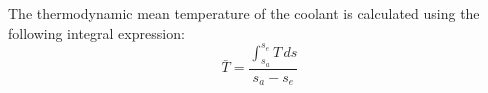 The thermodynamic mean temperature of the coolant is calculated using the following integral expression:  
\[
\bar{T} = \frac{\int_{s_a}^{s_e} T \, ds}{s_a - s_e}
\]